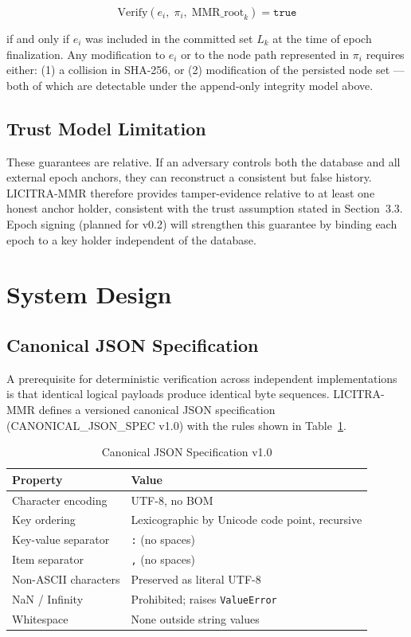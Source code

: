 \documentclass[sigconf,natbib=false]{acmart}
\begin{document}
\[
\text{Verify}(e_i,\; \pi_i,\; \text{MMR\_root}_k) = \texttt{true}
\]

if and only if $e_i$ was included in the committed set $L_k$ at the
time of epoch finalization. Any modification to $e_i$ or to the node
path represented in $\pi_i$ requires either: (1) a collision in
SHA-256, or (2) modification of the persisted node set — both of which
are detectable under the append-only integrity model above.

\subsection{Trust Model Limitation}

These guarantees are relative. If an adversary controls both the
database and all external epoch anchors, they can reconstruct a
consistent but false history. LICITRA-MMR therefore provides
tamper-evidence relative to at least one honest anchor holder,
consistent with the trust assumption stated in Section~3.3.
Epoch signing (planned for v0.2) will strengthen this guarantee
by binding each epoch to a key holder independent of the database.

\section{System Design}

\subsection{Canonical JSON Specification}

A prerequisite for deterministic verification across independent
implementations is that identical logical payloads produce identical byte
sequences. LICITRA-MMR defines a versioned canonical JSON specification
(CANONICAL\_JSON\_SPEC v1.0) with the rules shown in Table~\ref{tab:canon}.

\begin{table}[ht]
\caption{Canonical JSON Specification v1.0}
\label{tab:canon}
\begin{tabular}{lp{4.5cm}}
\toprule
Property & Value \\
\midrule
Character encoding & UTF-8, no BOM \\
Key ordering & Lexicographic by Unicode code point, recursive \\
Key-value separator & \texttt{:} (no spaces) \\
Item separator & \texttt{,} (no spaces) \\
Non-ASCII characters & Preserved as literal UTF-8 \\
NaN / Infinity & Prohibited; raises \texttt{ValueError} \\
Whitespace & None outside string values \\
\bottomrule
\end{tabular}
\end{table}
\end{document}
